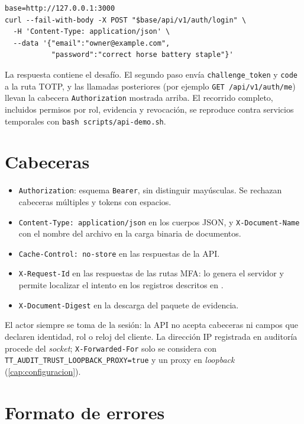 {\small
\begin{verbatim}
base=http://127.0.0.1:3000
curl --fail-with-body -X POST "$base/api/v1/auth/login" \
  -H 'Content-Type: application/json' \
  --data '{"email":"owner@example.com",
           "password":"correct horse battery staple"}'
\end{verbatim}
}

La respuesta contiene el desafío. El segundo paso envía
\texttt{challenge\_token} y \texttt{code} a la ruta TOTP, y las llamadas
posteriores (por ejemplo \texttt{GET /api/v1/auth/me}) llevan la cabecera
\texttt{Authorization} mostrada arriba. El recorrido completo, incluidos
permisos por rol, evidencia y revocación, se reproduce contra servicios
temporales con \texttt{bash scripts/api-demo.sh}.

\section{Cabeceras}\label{sec:api-cabeceras}

\begin{itemize}
  \item \texttt{Authorization}: esquema \texttt{Bearer}, sin distinguir
        mayúsculas. Se rechazan cabeceras múltiples y tokens con espacios.
  \item \texttt{Content-Type: application/json} en los cuerpos JSON, y
        \texttt{X-Document-Name} con el nombre del archivo en la carga
        binaria de documentos.
  \item \texttt{Cache-Control: no-store} en las respuestas de la API.
  \item \texttt{X-Request-Id} en las respuestas de las rutas MFA: lo genera
        el servidor y permite localizar el intento en los registros
        descritos en \archivo{docs/mfa-access-logs.md}.
  \item \texttt{X-Document-Digest} en la descarga del paquete de evidencia.
\end{itemize}

El actor siempre se toma de la sesión: la API no acepta cabeceras ni campos
que declaren identidad, rol o reloj del cliente. La dirección IP registrada en
auditoría procede del \emph{socket}; \texttt{X-Forwarded-For} solo se
considera con \texttt{TT\_AUDIT\_TRUST\_LOOPBACK\_PROXY=true} y un proxy en
\emph{loopback} (\cref{cap:configuracion}).

\section{Formato de errores}\label{sec:api-errores}

